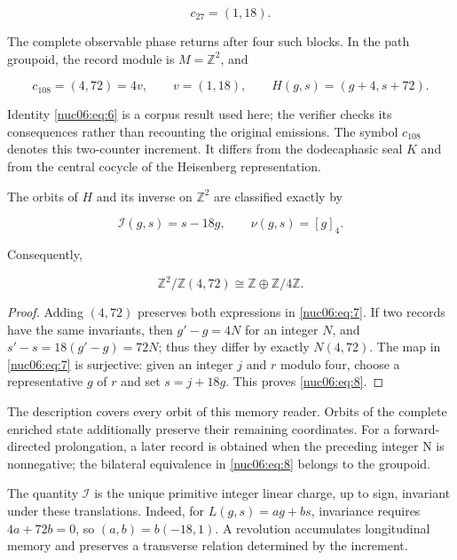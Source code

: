 \[
c_{27}=(1,18).
\]

The complete observable phase returns after four such blocks. In the path groupoid, the record module is \(M=\mathbb Z^2\), and

\begin{equation}
c_{108}=(4,72)=4v,\qquad v=(1,18),\qquad
H(g,s)=(g+4,s+72).
\label{nuc06:eq:6}
\end{equation}

Identity \eqref{nuc06:eq:6} is a corpus result used here; the verifier checks its consequences rather than recounting the original emissions. The symbol \(c_{108}\) denotes this two-counter increment. It differs from the dodecaphasic seal \(K\) and from the central cocycle of the Heisenberg representation.

\begin{theorem}

The orbits of \(H\) and its inverse on \(\mathbb Z^2\) are classified exactly by

\begin{equation}
\boxed{\quad \mathcal I(g,s)=s-18g,\qquad \nu(g,s)=[g]_4.\quad}
\label{nuc06:eq:7}
\end{equation}

Consequently,

\begin{equation}
\mathbb Z^2/\mathbb Z(4,72)\cong\mathbb Z\oplus\mathbb Z/4\mathbb Z.
\label{nuc06:eq:8}
\end{equation}
\end{theorem}

\begin{proof}
Adding \((4,72)\) preserves both expressions in \eqref{nuc06:eq:7}. If two records have the same invariants, then \(g'-g=4N\) for an integer \(N\), and \(s'-s=18(g'-g)=72N\); thus they differ by exactly \(N(4,72)\). The map in \eqref{nuc06:eq:7} is surjective: given an integer \(j\) and \(r\) modulo four, choose a representative \(g\) of \(r\) and set \(s=j+18g\). This proves \eqref{nuc06:eq:8}.
\end{proof}

The description covers every orbit of this memory reader. Orbits of the complete enriched state additionally preserve their remaining coordinates. For a forward-directed prolongation, a later record is obtained when the preceding integer N is nonnegative; the bilateral equivalence in \eqref{nuc06:eq:8} belongs to the groupoid.

The quantity \(\mathcal I\) is the unique primitive integer linear charge, up to sign, invariant under these translations. Indeed, for \(L(g,s)=ag+bs\), invariance requires \(4a+72b=0\), so \((a,b)=b(-18,1)\). A revolution accumulates longitudinal memory and preserves a transverse relation determined by the increment.

